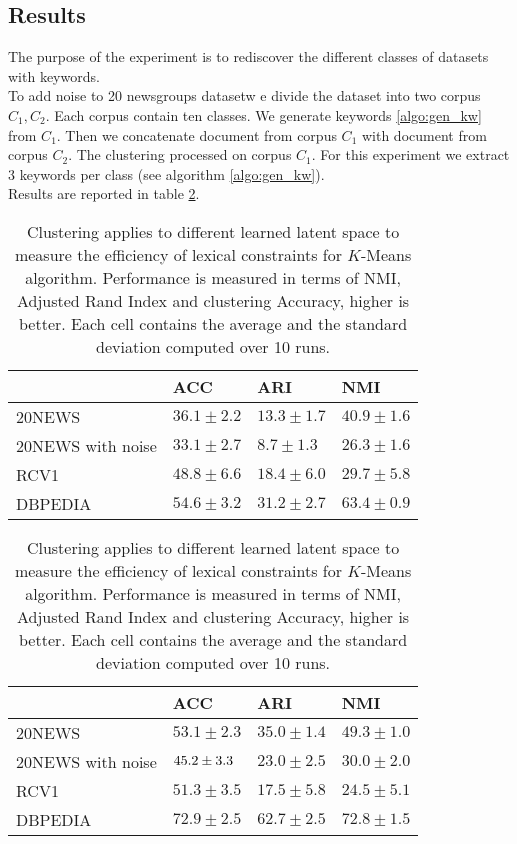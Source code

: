\subsection{Results}
The purpose of the experiment is to rediscover the different classes of 
datasets with keywords.\\
To add noise to 20 newsgroups datasetw e divide the dataset into two corpus $C_1, C_2$. 
Each corpus contain ten classes. We generate keywords \ref{algo:gen_kw} 
from $C_1$. Then we concatenate document from corpus $C_1$ with document
from corpus $C_2$. The clustering processed on corpus $C_1$. For this experiment
we extract 3 keywords per class (see algorithm \ref{algo:gen_kw}).
\\Results are reported in table \ref{tab:res}.
\begin{table}[h]
\caption{\label{tab:res}Clustering applies to 
different learned latent space to measure the efficiency of lexical constraints
for $K$-Means algorithm. Performance is measured in terms of NMI, Adjusted Rand 
Index and clustering Accuracy, higher is better. Each cell contains the average
and the standard deviation computed over 10 runs.}
\centering
  \begin{tabular}{|l|l|l|l|}
    \hline
    & ACC          &ARI           & NMI           \\ \hline
    20NEWS    &$36.1 \pm 2.2$&$13.3 \pm 1.7$&$40.9 \pm 1.6$ \\ \hline
    20NEWS with noise      &$33.1 \pm 2.7$&$8.7 \pm 1.3$ &$26.3 \pm 1.6$ \\ \hline
    RCV1      &$48.8 \pm 6.6$&$18.4 \pm 6.0$&$29.7 \pm 5.8$ \\ \hline
    DBPEDIA  &$54.6 \pm 3.2$& $31.2 \pm 2.7$& $63.4 \pm 0.9 $ \\ \hline
  \end{tabular}
  \begin{tabular}{|l|l|l|l|}
    \hline
    & ACC          &ARI           & NMI           \\ \hline
    20NEWS    &$53.1 \pm 2.3$&$35.0 \pm 1.4$&$49.3 \pm 1.0$  \\ \hline
    20NEWS with noise      &$\boldmath45.2 \pm 3.3$&$23.0 \pm 2.5$ &$30.0 \pm 2.0$ \\ \hline
    RCV1      &$51.3 \pm 3.5$&$17.5 \pm 5.8$&$24.5 \pm 5.1$ \\ \hline
    DBPEDIA  &$72.9 \pm 2.5$& $62.7 \pm 2.5$& $72.8 \pm 1.5 $ \\ \hline

\end{tabular}
\end{table}
